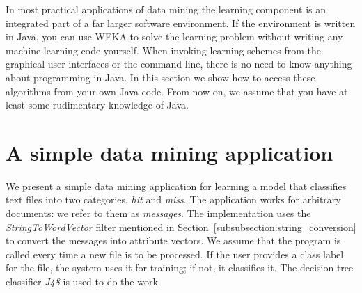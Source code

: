  In most practical applications of data mining the learning component
 is an integrated part of a far larger software environment. If the
 environment is written in Java, you can use WEKA to solve the
 learning problem without writing any machine learning code yourself.
 When invoking learning schemes from the graphical user interfaces or
 the command line, there is no need to know anything about programming
 in Java. In this section we show how to access these algorithms from
 your own Java code. From now on, we assume that you have at least
 some rudimentary knowledge of Java.

\section{A simple data mining application}

We present a simple data mining application for learning a model that
classifies text files into two categories, \textit{hit} and
\textit{miss}. The application works for arbitrary documents: we refer
to them as \textit{messages}. The implementation uses the
\textit{StringToWordVector} filter mentioned in
Section~\ref{subsubsection:string_conversion} to convert the
messages into attribute vectors. We assume that the program is called
every time a new file is to be processed. If the user provides a class
label for the file, the system uses it for training; if not, it
classifies it. The decision tree classifier \textit{J48} is used to do
the work.

